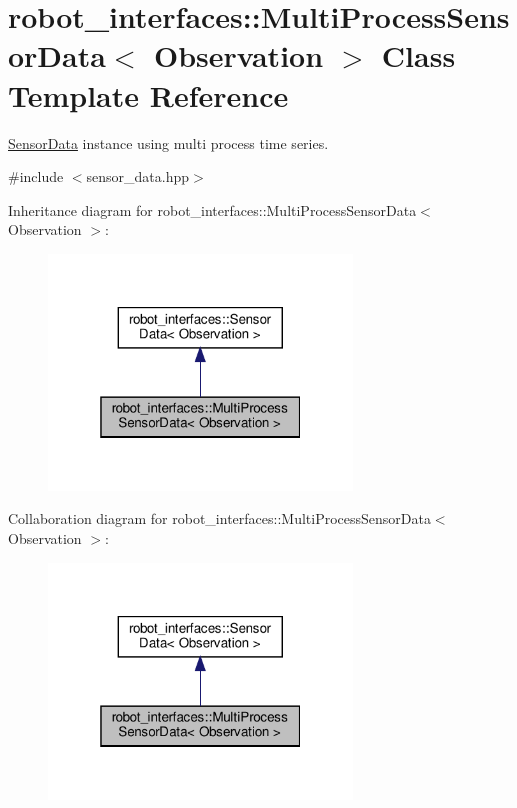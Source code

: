\hypertarget{classrobot__interfaces_1_1MultiProcessSensorData}{}\section{robot\+\_\+interfaces\+:\+:Multi\+Process\+Sensor\+Data$<$ Observation $>$ Class Template Reference}
\label{classrobot__interfaces_1_1MultiProcessSensorData}


\hyperlink{classrobot__interfaces_1_1SensorData}{Sensor\+Data} instance using multi process time series.  




{\ttfamily \#include $<$sensor\+\_\+data.\+hpp$>$}



Inheritance diagram for robot\+\_\+interfaces\+:\+:Multi\+Process\+Sensor\+Data$<$ Observation $>$\+:
\nopagebreak
\begin{figure}[H]
\begin{center}
\leavevmode
\includegraphics[width=229pt]{classrobot__interfaces_1_1MultiProcessSensorData__inherit__graph}
\end{center}
\end{figure}


Collaboration diagram for robot\+\_\+interfaces\+:\+:Multi\+Process\+Sensor\+Data$<$ Observation $>$\+:
\nopagebreak
\begin{figure}[H]
\begin{center}
\leavevmode
\includegraphics[width=229pt]{classrobot__interfaces_1_1MultiProcessSensorData__coll__graph}
\end{center}
\end{figure}
